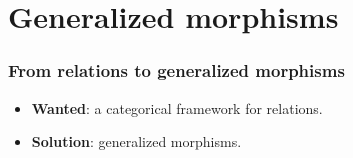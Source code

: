 \begin{frame}[fragile]
 \begin{block}{}
 \begin{center}
  \end{center}
 \end{block}
 
\end{frame}

\section{Generalized morphisms}

\begin{frame}[fragile]
 \frametitle{From relations to generalized morphisms}
 \begin{block}{}
 \begin{center}
  \begin{itemize}
   \item \textbf{\color{blue}Wanted}: a categorical framework for relations.
   \pause
   \item \textbf{\color{blue}Solution}: generalized morphisms.
  \end{itemize}
 \end{center}
 \end{block} 
\end{frame}


